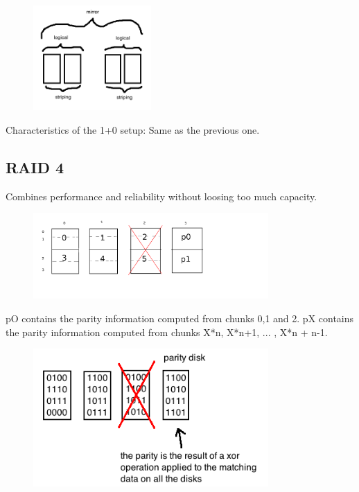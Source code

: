 \documentclass[a4paper,10pt]{report}
\begin{document}
\begin{figure}[h!]
  \begin{center}
    \includegraphics[width=0.4\textwidth]{1_plus_0.png}
    \caption{}
  \end{center}
\end{figure}
Characteristics of the 1+0 setup:
Same as the previous one. 

\subsection{RAID 4}

Combines performance and reliability without loosing too much capacity.

\begin{figure}[h!]
  \begin{center}
    \includegraphics[width=0.8\textwidth]{raid_4.png}
    \caption{}
  \end{center}
\end{figure}

pO contains the parity information computed from chunks 0,1 and 2.
pX contains the parity information computed from chunks X*n, X*n+1, ... , X*n + n-1.

\begin{figure}[h!]
  \begin{center}
    \includegraphics[width=0.8\textwidth]{parity_disk.png}
    \caption{}
  \end{center}
\end{figure}
\end{document}
